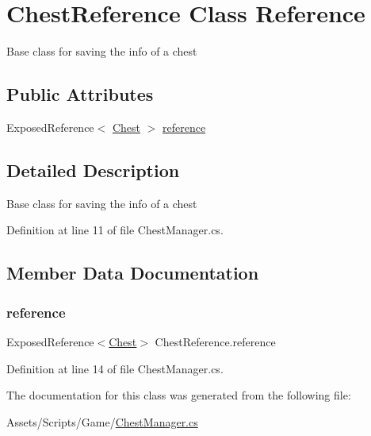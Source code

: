 \hypertarget{class_chest_reference}{}\section{Chest\+Reference Class Reference}
\label{class_chest_reference}


Base class for saving the info of a chest  


\subsection*{Public Attributes}
\begin{DoxyCompactItemize}
\item 
Exposed\+Reference$<$ \mbox{\hyperlink{class_chest}{Chest}} $>$ \mbox{\hyperlink{class_chest_reference_a1881bfcc93c378a23285ac2bf5cff1df}{reference}}
\end{DoxyCompactItemize}


\subsection{Detailed Description}
Base class for saving the info of a chest 



Definition at line 11 of file Chest\+Manager.\+cs.



\subsection{Member Data Documentation}
\mbox{\label{class_chest_reference_a1881bfcc93c378a23285ac2bf5cff1df}} 
\subsubsection{\texorpdfstring{reference}{reference}}
{\footnotesize\ttfamily Exposed\+Reference$<$\mbox{\hyperlink{class_chest}{Chest}}$>$ Chest\+Reference.\+reference}



Definition at line 14 of file Chest\+Manager.\+cs.



The documentation for this class was generated from the following file\+:\begin{DoxyCompactItemize}
\item 
Assets/\+Scripts/\+Game/\mbox{\hyperlink{_chest_manager_8cs}{Chest\+Manager.\+cs}}\end{DoxyCompactItemize}
